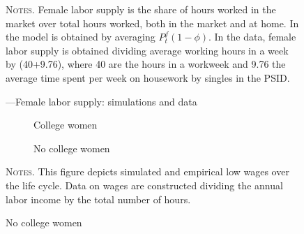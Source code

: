 \documentclass[12pt]{article}
\begin{document}
\begin{figure}
\begin{center}
\caption{---Female labor supply: simulations and data}
\label{fig:fls}
\hspace*{-1.3cm} 
\scalebox{0.99}{} 
\end{center}
\begin{minipage}{0.99\textwidth} %
	{\scriptsize \textsc{Notes.} Female labor supply is the share of hours worked in the market over total hours worked, both in the market and at home. In the model is obtained by averaging $P^f_t(1-\phi)$. In the data, female labor supply is obtained dividing average working hours in a week by (40+9.76), where 40 are the hours in a workweek and 9.76 the average time spent per week on housework by singles in the PSID. \par}
\end{minipage}
\end{figure}
\begin{figure}[h!]
\begin{center}
\caption{---Low wages over the life cycle: simulations and data}
\label{fig:incomedata}
\begin{center}
\begin{subfigure}{.49\textwidth}
\centering
\caption{College women}
\label{fig:ef}
\scalebox{0.5}{ } 
\end{subfigure}
\begin{subfigure}{.49\textwidth}
\centering
\caption{No college women}
\label{fig:nf}
\scalebox{0.5}{ } 
\end{subfigure}
\end{center}

\begin{minipage}{0.99\textwidth} %
	\vspace{1em}
{\scriptsize \textsc{Notes.} This figure depicts simulated and empirical low wages over the life cycle. Data on wages are constructed dividing the annual labor income by the total number of hours. \par}
\end{minipage}
\end{center}
\end{figure}
\end{document}
